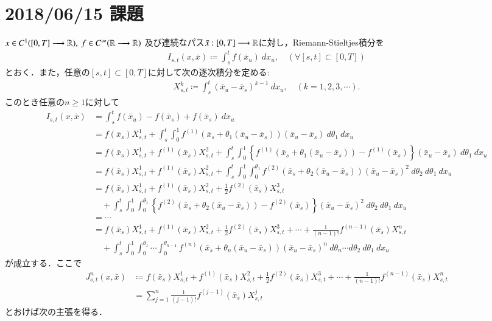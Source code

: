 \section{2018/06/15 課題}
	$x \in C^1([0,T] \longrightarrow \mathbb{R}),\ f \in C^\infty(\mathbb{R} \longrightarrow \mathbb{R})$
	及び連続なパス$\bar{x}:[0,T] \longrightarrow \mathbb{R}$に対し，Riemann-Stieltjes積分を
	\begin{align}
		I_{s,t}(x,\bar{x}) \coloneqq \int_s^t f(\bar{x}_u)\ dx_u,
		\quad (\forall [s,t] \subset [0,T])
	\end{align}
	とおく．また，任意の$[s,t] \subset [0,T]$に対して次の逐次積分を定める:
	\begin{align}
		X^k_{s,t} \coloneqq \int_s^t (\bar{x}_u-\bar{x}_s)^{k-1}\ dx_u,
		\quad (k=1,2,3,\cdots).
	\end{align}
	このとき任意の$n \geq 1$に対して
	\begin{align}
		I_{s,t}(x,\bar{x}) 
		&= \int_s^t f(\bar{x}_u) - f(\bar{x}_s) + f(\bar{x}_s)\ dx_u \\
		&= f(\bar{x}_s) X^1_{s,t} + \int_s^t \int_0^1 f^{(1)}(\bar{x}_s + \theta_1(\bar{x}_u - \bar{x}_s))(\bar{x}_u - \bar{x}_s)\ d\theta_1\ dx_u \\
		&= f(\bar{x}_s) X^1_{s,t} + f^{(1)}(\bar{x}_s) X^2_{s,t}
			+ \int_s^t \int_0^1 \left\{f^{(1)}(\bar{x}_s + \theta_1(\bar{x}_u - \bar{x}_s)) - f^{(1)}(\bar{x}_s) \right\}(\bar{x}_u - \bar{x}_s)\ d\theta_1\ dx_u \\
		&= f(\bar{x}_s) X^1_{s,t} + f^{(1)}(\bar{x}_s) X^2_{s,t}
			+ \int_s^t \int_0^1 \int_0^{\theta_1} f^{(2)}(\bar{x}_s + \theta_2(\bar{x}_u - \bar{x}_s))(\bar{x}_u - \bar{x}_s)^2\ d\theta_2\ d\theta_1\ dx_u \\
		&= f(\bar{x}_s) X^1_{s,t} + f^{(1)}(\bar{x}_s) X^2_{s,t} + \frac{1}{2} f^{(2)}(\bar{x}_s) X^3_{s,t} \\
			&\quad + \int_s^t \int_0^1 \int_0^{\theta_1} \left\{ f^{(2)}(\bar{x}_s + \theta_2(\bar{x}_u - \bar{x}_s)) - f^{(2)}(\bar{x}_s) \right\}(\bar{x}_u - \bar{x}_s)^2\ d\theta_2\ d\theta_1\ dx_u \\
		&=\cdots \\
		&= f(\bar{x}_s) X^1_{s,t} + f^{(1)}(\bar{x}_s) X^2_{s,t} + \frac{1}{2} f^{(2)}(\bar{x}_s) X^3_{s,t} + \cdots + \frac{1}{(n-1)!} f^{(n-1)}(\bar{x}_s) X^n_{s,t} \\
			&\quad + \int_s^t \int_0^1 \int_0^{\theta_1} \cdots \int_0^{\theta_{n-1}} f^{(n)}(\bar{x}_s + \theta_n(\bar{x}_u - \bar{x}_s))(\bar{x}_u - \bar{x}_s)^n\ d\theta_n\cdots d\theta_2\ d\theta_1\ dx_u
	\end{align}
	が成立する．ここで
	\begin{align}
		J^n_{s,t}(x,\bar{x}) &\coloneqq f(\bar{x}_s) X^1_{s,t} + f^{(1)}(\bar{x}_s) X^2_{s,t} + \frac{1}{2} f^{(2)}(\bar{x}_s) X^3_{s,t} + \cdots + \frac{1}{(n-1)!} f^{(n-1)}(\bar{x}_s) X^n_{s,t} \\
		&= \sum_{j=1}^n \frac{1}{(j-1)!} f^{(j-1)}(\bar{x}_s) X^j_{s,t}
	\end{align}
	とおけば次の主張を得る．
	
